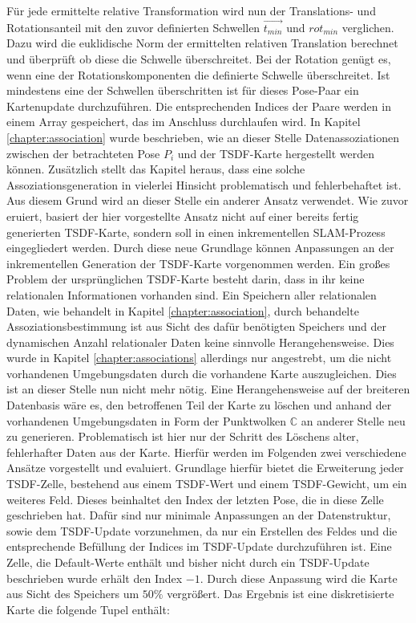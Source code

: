 Für jede ermittelte relative Transformation wird nun der Translations- und Rotationsanteil mit den zuvor definierten Schwellen $\vec{t_{min}}$ und $rot_{min}$ verglichen. Dazu wird die euklidische Norm der ermittelten relativen Translation berechnet und überprüft ob diese die Schwelle überschreitet. Bei der Rotation genügt es, wenn eine der Rotationskomponenten die definierte Schwelle überschreitet. Ist mindestens eine der Schwellen überschritten ist für dieses Pose-Paar ein Kartenupdate durchzuführen. Die entsprechenden Indices der Paare werden in einem Array gespeichert, das im Anschluss durchlaufen wird. In Kapitel \ref{chapter:association} wurde beschrieben, wie an dieser Stelle Datenassoziationen zwischen der betrachteten Pose $P_i$ und der TSDF-Karte hergestellt werden können. Zusätzlich stellt das Kapitel heraus, dass eine solche Assoziationsgeneration in vielerlei Hinsicht problematisch und fehlerbehaftet ist. Aus diesem Grund wird an dieser Stelle ein anderer Ansatz verwendet. Wie zuvor eruiert, basiert der hier vorgestellte Ansatz nicht auf einer bereits fertig generierten TSDF-Karte, sondern soll in einen inkrementellen SLAM-Prozess eingegliedert werden. Durch diese neue Grundlage können Anpassungen an der inkrementellen Generation der TSDF-Karte vorgenommen werden. Ein großes Problem der ursprünglichen TSDF-Karte besteht darin, dass in ihr keine relationalen Informationen vorhanden sind. Ein Speichern aller relationalen Daten, wie behandelt in Kapitel \ref{chapter:association}, durch behandelte Assoziationsbestimmung ist aus Sicht des dafür benötigten Speichers und der dynamischen Anzahl relationaler Daten keine sinnvolle Herangehensweise. Dies wurde in Kapitel \ref{chapter:associations} allerdings nur angestrebt, um die nicht vorhandenen Umgebungsdaten durch die vorhandene Karte auszugleichen. Dies ist an dieser Stelle nun nicht mehr nötig. Eine Herangehensweise auf der breiteren Datenbasis wäre es, den betroffenen Teil der Karte zu löschen und anhand der vorhandenen Umgebungsdaten in Form der Punktwolken $\mathbb{C}$ an anderer Stelle neu zu generieren. Problematisch ist hier nur der Schritt des Löschens alter, fehlerhafter Daten aus der Karte. Hierfür werden im Folgenden zwei verschiedene Ansätze vorgestellt und evaluiert. Grundlage hierfür bietet die Erweiterung jeder TSDF-Zelle, bestehend aus einem TSDF-Wert und einem TSDF-Gewicht, um ein weiteres Feld. Dieses beinhaltet den Index der letzten Pose, die in diese Zelle geschrieben hat. Dafür sind nur minimale Anpassungen an der Datenstruktur, sowie dem TSDF-Update vorzunehmen, da nur ein Erstellen des Feldes und die entsprechende Befüllung der Indices im TSDF-Update durchzuführen ist. Eine Zelle, die Default-Werte enthält und bisher nicht durch ein TSDF-Update beschrieben wurde erhält den Index $-1$. Durch diese Anpassung wird die Karte aus Sicht des Speichers um $50\%$ vergrößert. Das Ergebnis ist eine diskretisierte Karte die folgende Tupel enthält:

